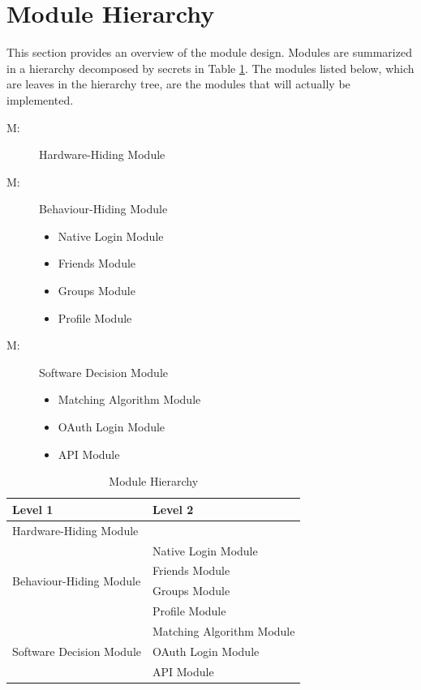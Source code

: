 \documentclass[12pt, titlepage]{article}
\newcounter{mnum}
\newcommand{\mthemnum}{M\themnum}
\begin{document}
\section{Module Hierarchy} \label{SecMH}

This section provides an overview of the module design. Modules are summarized
in a hierarchy decomposed by secrets in Table \ref{TblMH}. The modules listed
below, which are leaves in the hierarchy tree, are the modules that will
actually be implemented.

\begin{description}
\item [ \mthemnum \label{mHH}:] Hardware-Hiding Module
\item [ \mthemnum \label{mBH}:] Behaviour-Hiding Module
	\begin{itemize}
		\item [\refstepcounter{mnum} \mthemnum \label{mNL}:] Native Login Module
		\item [\refstepcounter{mnum} \mthemnum \label{mF}:] Friends Module
		\item [\refstepcounter{mnum} \mthemnum \label{mG}:] Groups Module
		\item [\refstepcounter{mnum} \mthemnum \label{mP}:] Profile Module
	\end{itemize}
\item [ \mthemnum \label{mSD}:] Software Decision Module
	\begin{itemize}
		\item [\refstepcounter{mnum} \mthemnum \label{mMA}:] Matching Algorithm Module
		\item [\refstepcounter{mnum} \mthemnum \label{mOL}:] OAuth Login Module
		\item [\refstepcounter{mnum} \mthemnum \label{mA}:] API Module
	\end{itemize}
\end{description}


\begin{table}[h!]
\centering
\begin{tabular}{p{} p{}}
\toprule
\textbf{Level 1} & \textbf{Level 2}\\
\midrule

{Hardware-Hiding Module} & ~ \\
\midrule

\multirow{4}{0.3\textwidth}{Behaviour-Hiding Module} & {Native Login Module}\\
& Friends Module\\
& Groups Module\\
& Profile Module\\
\midrule

\multirow{3}{0.3\textwidth}{Software Decision Module} & {Matching Algorithm Module}\\
& OAuth Login Module\\
& API Module\\
\bottomrule

\end{tabular}
\caption{Module Hierarchy}
\label{TblMH}
\end{table}
\end{document}
